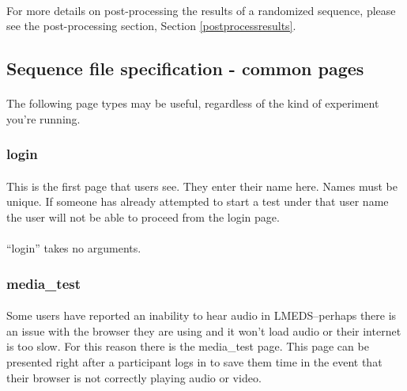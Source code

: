 \paragraph{}
For more details on post-processing the results of a randomized sequence, please see the post-processing section, Section \ref{postprocessresults}.


\subsection{Sequence file specification - common pages}
\label{sec:sequenceSpecBasic}

\paragraph{}
The following page types may be useful, regardless of the kind of experiment you're running.


\subsubsection{login}

\paragraph{}
This is the first page that users see.  They enter their name here.  Names must be unique.  If someone has already attempted to start a test under that user name the user will not be able to proceed from the login page.

\paragraph{}
``login'' takes no arguments.


\subsubsection{media\_test}

\paragraph{}
Some users have reported an inability to hear audio in LMEDS--perhaps there is an issue with the browser they are using and it won't load audio or their internet is too slow.  For this reason there is the media\_test page.  This page can be presented right after a participant logs in to save them time in the event that their browser is not correctly playing audio or video.

